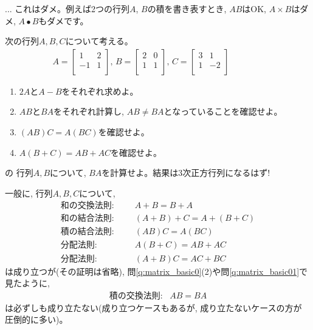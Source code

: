 \begin{freqmiss}{\small{} ... これはダメ。例えば2つの行列$A$, $B$の積を書き表すとき, 
$AB$はOK, $A\times B$はダメ, $A\bullet B$もダメです。}\end{freqmiss}

\begin{q}\label{q:matrix_basic0} 次の行列$A, B, C$について考える。
\begin{eqnarray}
A=\begin{bmatrix}
1 & 2 \\
-1 & 1 \\
\end{bmatrix},\,
B=\begin{bmatrix}
2 & 0 \\
1 & 1 \\
\end{bmatrix},\,
C=\begin{bmatrix}
3 & 1 \\
1 & -2 \\
\end{bmatrix}\quad\quad\quad\quad\label{eq:matrix_ABC}
\end{eqnarray}
\begin{enumerate}
\item $2A$と$A-B$をそれぞれ求めよ。
\item $AB$と$BA$をそれぞれ計算し, $AB\ne BA$となっていることを確認せよ。
\item $(AB)C=A(BC)$を確認せよ。
\item $A(B+C)=AB+AC$を確認せよ。
\end{enumerate}\end{q}

\begin{q}\label{q:matrix_basic01} の
行列$A, B$について, $BA$を計算せよ。結果は3次正方行列になるはず!\end{q}
\mv

一般に, 行列$A, B, C$について, 
\begin{eqnarray*}
\text{和の交換法則: }&&\,\,\,A+B=B+A\\
\text{和の結合法則: }&&\,\,\,(A+B)+C=A+(B+C)\\
\text{積の結合法則: }&&\,\,\,(AB)C=A(BC)\\
\text{分配法則: }&&\,\,\,A(B+C)=AB+AC\\
\text{分配法則: }&&\,\,\,(A+B)C=AC+BC
\end{eqnarray*}
は成り立つが(その証明は省略), 問\ref{q:matrix_basic0}(2)や問\ref{q:matrix_basic01}で見たように, 
\begin{eqnarray*}
\text{積の交換法則: }\,\,\,AB=BA\end{eqnarray*}
は必ずしも成り立たない(成り立つケースもあるが, 成り立たないケースの方が
圧倒的に多い)。
\vv


